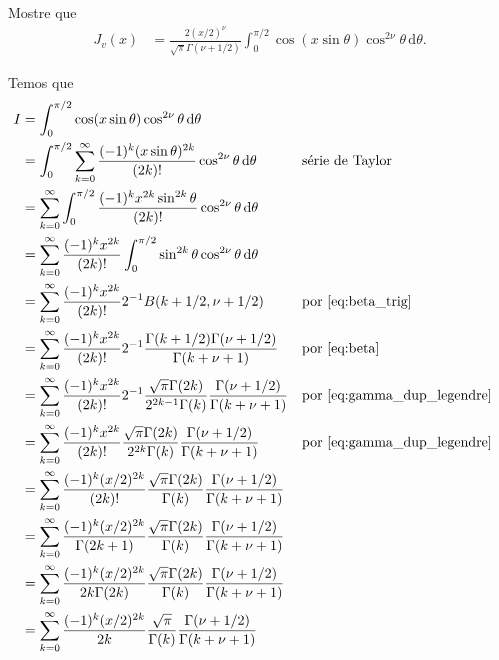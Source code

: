 \documentclass[a4paper,12pt, leqno, answers]{exam}
\begin{document}
\begin{questions}
    \question Mostre que
    \begin{align*}
        J_v(x) &= \frac{2(x/2)^\nu}{\sqrt{\pi} \Gamma(\nu + 1/2)} \int_0^{\pi/2} \cos(x \sin \theta) \cos^{2\nu} \theta \,\mathrm{d}\theta.
    \end{align*}
    \begin{solution}
        Temos que
        \begin{align*}
            I &= \int_0^{\pi/2} \cos(x \sin \theta) \cos^{2 \nu} \theta \,\mathrm{d}\theta \\
            &= \int_0^{\pi/2} \sum_{k = 0}^\infty \frac{(-1)^k (x \sin \theta)^{2k}}{(2k)!} \cos^{2\nu} \theta \,\mathrm{d}\theta && \text{s\'{e}rie de Taylor} \\
            &= \sum_{k = 0}^\infty \int_0^{\pi/2} \frac{(-1)^k x^{2k} \sin^{2k} \theta}{(2k)!} \cos^{2\nu} \theta \,\mathrm{d}\theta \\
            &= \sum_{k = 0}^\infty \frac{(-1)^k x^{2k}}{(2k)!} \int_0^{\pi/2} \sin^{2k} \theta \cos^{2\nu} \theta \,\mathrm{d}\theta \\
            &= \sum_{k = 0}^\infty \frac{(-1)^k x^{2k}}{(2k)!} 2^{-1} B(k + 1/2, \nu + 1/2) && \text{por \eqref{eq:beta_trig}} \\
            &= \sum_{k = 0}^\infty \frac{(-1)^k x^{2k}}{(2k)!} 2^{-1} \frac{\Gamma(k + 1/2) \Gamma(\nu + 1/2)}{\Gamma(k + \nu + 1)} && \text{por \eqref{eq:beta}} \\
            &= \sum_{k = 0}^\infty \frac{(-1)^k x^{2k}}{(2k)!} 2^{-1} \frac{\sqrt{\pi} \Gamma(2k)}{2^{2k - 1} \Gamma(k)} \frac{\Gamma(\nu + 1/2)}{\Gamma(k + \nu + 1)} && \text{por \eqref{eq:gamma_dup_legendre}} \\
            &= \sum_{k = 0}^\infty \frac{(-1)^k x^{2k}}{(2k)!} \frac{\sqrt{\pi} \Gamma(2k)}{2^{2k} \Gamma(k)} \frac{\Gamma(\nu + 1/2)}{\Gamma(k + \nu + 1)} && \text{por \eqref{eq:gamma_dup_legendre}} \\
            &= \sum_{k = 0}^\infty \frac{(-1)^k (x/2)^{2k}}{(2k)!} \frac{\sqrt{\pi} \Gamma(2k)}{\Gamma(k)} \frac{\Gamma(\nu + 1/2)}{\Gamma(k + \nu + 1)} \\
            &= \sum_{k = 0}^\infty \frac{(-1)^k (x/2)^{2k}}{\Gamma(2k + 1)} \frac{\sqrt{\pi} \Gamma(2k)}{\Gamma(k)} \frac{\Gamma(\nu + 1/2)}{\Gamma(k + \nu + 1)} \\
            &= \sum_{k = 0}^\infty \frac{(-1)^k (x/2)^{2k}}{2k \Gamma(2k)} \frac{\sqrt{\pi} \Gamma(2k)}{\Gamma(k)} \frac{\Gamma(\nu + 1/2)}{\Gamma(k + \nu + 1)} \\
            &= \sum_{k = 0}^\infty \frac{(-1)^k (x/2)^{2k}}{2k} \frac{\sqrt{\pi}}{\Gamma(k)} \frac{\Gamma(\nu + 1/2)}{\Gamma(k + \nu + 1)} \\

\end{align*}
\end{solution}
\end{questions}
\end{document}
